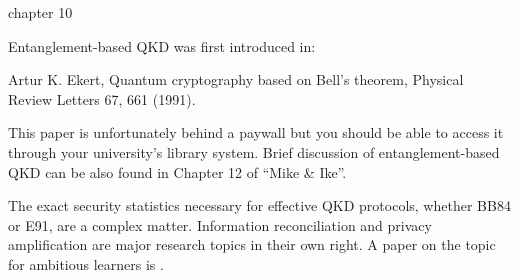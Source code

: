 chapter 10

Entanglement-based QKD was first introduced in:

Artur K. Ekert, Quantum cryptography based on Bell’s theorem, Physical Review Letters 67, 661 (1991).

This paper is unfortunately behind a paywall but you should be able to access it through your university’s library system.
Brief discussion of entanglement-based QKD can be also found in Chapter 12 of “Mike \& Ike”.

The exact security statistics necessary for effective QKD protocols, whether BB84 or E91, are a complex matter.  Information reconciliation and privacy amplification are major research topics in their own right. A paper on the topic for ambitious learners is .